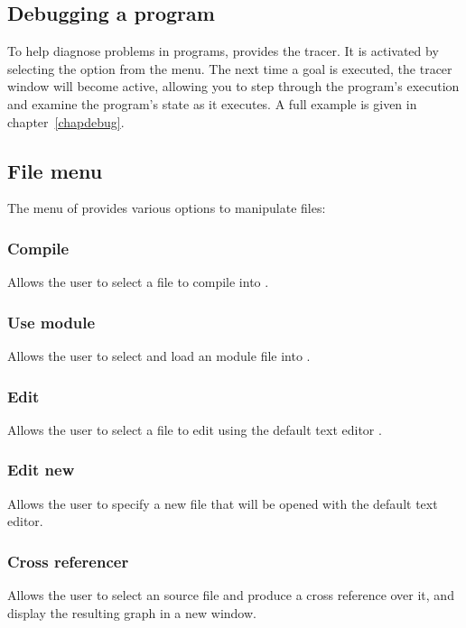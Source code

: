 \subsection{Debugging a program}
\label{secdebug}

To help diagnose problems in {\eclipse} programs, {\tkeclipse}
provides the tracer.  It is activated by selecting the
 option from the  menu.  The next time
a goal is executed, the tracer window will become active, allowing you
to step through the program's execution and examine the program's
state as it executes.  A full example is given in
chapter~\ref{chapdebug}.

\subsection{File menu}

The  menu of {\tkeclipse} provides various options to
manipulate files:

\subsubsection{Compile} 
Allows the user to select a file to compile into {\eclipse}. 

\subsubsection{Use module}
Allows the user to select and load an {\eclipse} module file into
{\eclipse}.

\subsubsection{Edit} 
Allows the user to select a file to edit using the default text editor 
.

\subsubsection{Edit new}
Allows the user to specify a new file that will be opened with the default
text editor.

\subsubsection{Cross referencer}
Allows the user to select an {\eclipse} source file and produce a cross
reference over it, and display the resulting graph in a new window.

